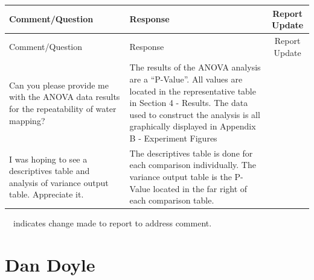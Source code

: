\documentclass[12pt,oneside]{book}
\begin{document}
\begin{landscape}
\begin{longtable}{|L{4in}|L{3.75in}|c|}
		\hline
		Comment/Question & Response & Report Update \\ 
		\toprule[1.0pt] \endfirsthead
		\hline
		Comment/Question & Response & Report Update \\ 
		\toprule[1.0pt] \endhead
		\hline
		Can you please provide me with the ANOVA data results for the repeatability of water mapping? &
		The results of the ANOVA analysis are a ``P-Value''. All values are located in the representative table in Section 4 - Results. The data used to construct the analysis is all graphically displayed in Appendix B - Experiment Figures & \\
		\hline
		I was hoping to see a descriptives table and analysis of variance output table. Appreciate it. &
		The descriptives table is done for each comparison individually. The variance output table is the P-Value located in the far right of each comparison table. & \\
		\hline

\end{longtable}
\checkmark~~indicates change made to report to address comment.

\newpage

\section{Dan Doyle}
\begin{longtable}{|L{4in}|L{3.75in}|c|}


\end{longtable}
\end{landscape}
\end{document}
